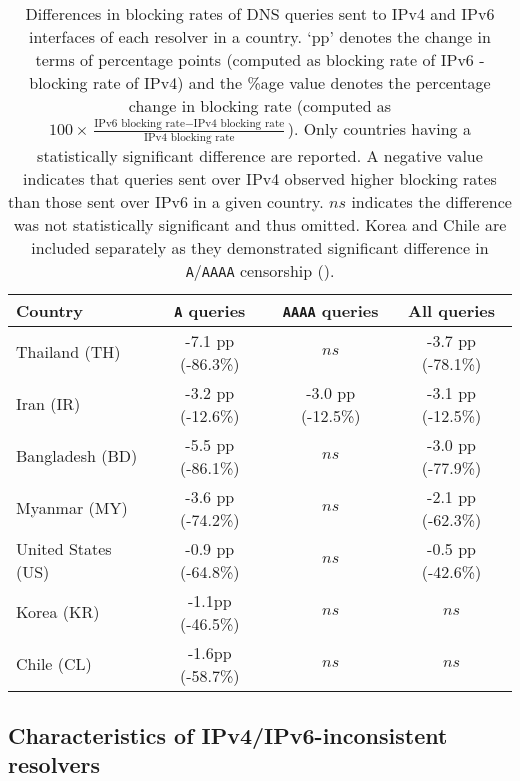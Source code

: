 \begin{table}[t]
  \centering
  \small
  \scalebox{\tabularscale} {
  \begin{tabular}{lccc}%
    \toprule
    {\bf Country}&{\bf {\tt A} queries }&{\bf {\tt AAAA} queries} & {\bf All queries}
    \\ \midrule
    Thailand (TH)      & -7.1 pp (-86.3\%) & $ns$              & -3.7 pp (-78.1\%) \\
    Iran (IR)          & -3.2 pp (-12.6\%) & -3.0 pp (-12.5\%) & -3.1 pp (-12.5\%) \\ 
    Bangladesh (BD)    & -5.5 pp (-86.1\%) & $ns$              & -3.0 pp (-77.9\%) \\
    Myanmar (MY)       & -3.6 pp (-74.2\%) & $ns$              & -2.1 pp (-62.3\%) \\
    United States (US) & -0.9 pp (-64.8\%) & $ns$              & -0.5 pp (-42.6\%) \\
    \midrule
    Korea (KR)         & -1.1pp (-46.5\%) & $ns$    & $ns$ \\
    Chile (CL)         & -1.6pp (-58.7\%)  & $ns$    & $ns$ \\
    \bottomrule
  \end{tabular}
  }
  \caption{Differences in blocking rates of DNS queries sent to IPv4 and IPv6
  interfaces of each resolver in a country. `pp' denotes the change in
  terms of percentage points (computed as blocking rate of IPv6 - blocking
  rate of IPv4) and the \%age value denotes the percentage change in blocking rate
  (computed as 
  $
  100 \times \frac{\text{IPv6 blocking rate} - \text{IPv4 blocking rate}}
  {\text{IPv4 blocking rate}}
  $). 
  Only countries having a statistically significant difference are reported. A
  negative value indicates that queries sent over IPv4 observed higher blocking
  rates than those sent over IPv6 in a given country. $ns$ indicates the
  difference was not statistically significant and thus omitted. Korea and Chile
  are included separately as they demonstrated significant difference in
  \texttt{A}/\texttt{AAAA} censorship ().}
  \label{tab:infrastructure:countries}
\end{table}

\subsection{Characteristics of IPv4/IPv6-inconsistent resolvers}
\label{sec:infrastructure:resolvers}
%


